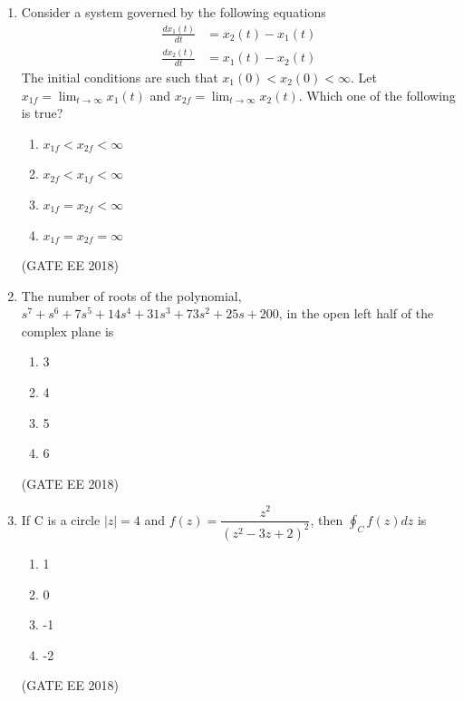 \documentclass[journal,12pt,onecolumn]{IEEEtran}
\theoremstyle{remark}
\begin{document}
\begin{enumerate}
\item Consider a system governed by the following equations
\begin{align*}
\frac{dx_1(t)}{dt} &= x_2(t) - x_1(t) \\
\frac{dx_2(t)}{dt} &= x_1(t) - x_2(t)
\end{align*}
The initial conditions are such that $x_1(0) < x_2(0) < \infty$. Let $x_{1f} = \lim_{t \to \infty} x_1(t)$ and $x_{2f} = \lim_{t \to \infty} x_2(t)$. Which one of the following is true?
\begin{multicols}{4}
\begin{enumerate}
    \item $x_{1f} < x_{2f} < \infty$
    \item $x_{2f} < x_{1f} < \infty$
    \item $x_{1f} = x_{2f} < \infty$
    \item $x_{1f} = x_{2f} = \infty$
\end{enumerate}
\end{multicols}
\hfill{(GATE EE 2018)}

\item The number of roots of the polynomial, $s^7 + s^6 + 7s^5 + 14s^4 + 31s^3 + 73s^2 + 25s + 200$, in the open left half of the complex plane is
\begin{multicols}{4}
\begin{enumerate}
    \item 3
    \item 4
    \item 5
    \item 6
\end{enumerate}
\end{multicols}
\hfill{(GATE EE 2018)}

\item If C is a circle $|z|=4$ and $f(z) = \dfrac{z^2}{(z^2-3z+2)^2}$, then $\oint_C f(z) dz$ is
\begin{multicols}{4}
\begin{enumerate}
    \item 1
    \item 0
    \item -1
    \item -2
\end{enumerate}
\end{multicols}
\hfill{(GATE EE 2018)}


\end{enumerate}
\end{document}

